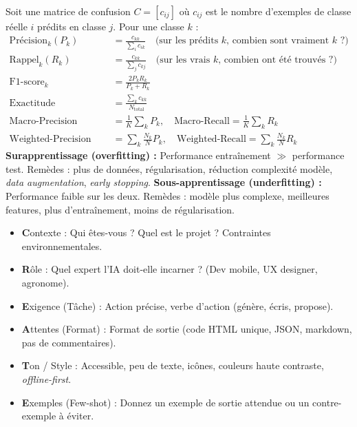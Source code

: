 \documentclass[11pt]{article}
\newcommand{\cle}[1]{{\popxbold\color{popdark}#1}}
\newcounter{popsec}
\newcounter{popsub}
\newcommand{\courssub}[1]{%
  \stepcounter{popsub}%
  \par\vspace{9pt}\noindent{\popxbold\fontsize{11.5}{13}\selectfont\color{popink}{\color{poporange}\thepopsec.\thepopsub}\hspace{6pt}#1}\par\nopagebreak\vspace{4pt}
}
\begin{document}
\courssub{Ressources à mobiliser}
\begin{propriete}
Soit une matrice de confusion $C = [c_{ij}]$ où $c_{ij}$ est le nombre d'exemples de classe réelle $i$ prédits en classe $j$. Pour une classe $k$ :
\begin{align*}
    \text{Précision}_k (P_k) &= \frac{c_{kk}}{\sum_i c_{ik}} \quad \text{(sur les prédits $k$, combien sont vraiment $k$ ?)} \\
    \text{Rappel}_k (R_k) &= \frac{c_{kk}}{\sum_j c_{kj}} \quad \text{(sur les vrais $k$, combien ont été trouvés ?)} \\
    \text{F1-score}_k &= \frac{2 P_k R_k}{P_k + R_k} \\
    \text{Exactitude (Accuracy)} &= \frac{\sum_k c_{kk}}{N_{\text{total}}} \\
    \text{Macro-Precision} &= \frac{1}{K}\sum_k P_k, \quad \text{Macro-Recall} = \frac{1}{K}\sum_k R_k \\
    \text{Weighted-Precision} &= \sum_k \frac{N_k}{N} P_k, \quad \text{Weighted-Recall} = \sum_k \frac{N_k}{N} R_k
\end{align*}
\textbf{Surapprentissage (\cle{overfitting}) :} Performance entraînement $\gg$ performance test. Remèdes : plus de données, régularisation, réduction complexité modèle, \emph{data augmentation}, \emph{early stopping}.
\textbf{Sous-apprentissage (\cle{underfitting}) :} Performance faible sur les deux. Remèdes : modèle plus complexe, meilleures features, plus d'entraînement, moins de régularisation.
\end{propriete}

\begin{propriete}
\begin{itemize}
    \item \textbf{C}ontexte : Qui êtes-vous ? Quel est le projet ? Contraintes environnementales.
    \item \textbf{R}ôle : Quel expert l'IA doit-elle incarner ? (Dev mobile, UX designer, agronome).
    \item \textbf{E}xigence (Tâche) : Action précise, verbe d'action (génère, écris, propose).
    \item \textbf{A}ttentes (Format) : Format de sortie (code HTML unique, JSON, markdown, pas de commentaires).
    \item \textbf{T}on / Style : Accessible, peu de texte, icônes, couleurs haute contraste, \emph{offline-first}.
    \item \textbf{E}xemples (Few-shot) : Donnez un exemple de sortie attendue ou un contre-exemple à éviter.
\end{itemize}
\end{propriete}
\end{document}
